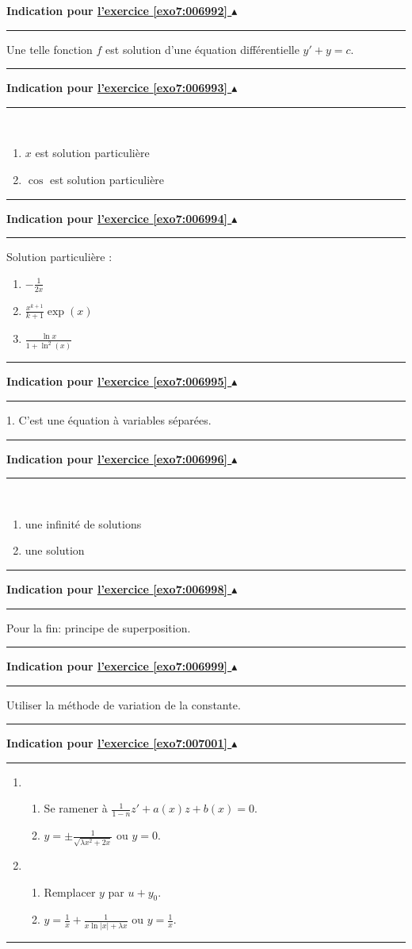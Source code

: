 \documentclass[11pt,a4paper]{article}
\newcommand{\finexercice}{}
\newcommand{\noindication}{}
\newcounter{exo}
\newcommand{\indication}[1]{\hypertarget{ind7:#1}{}\label{ind7:#1}{\bf Indication pour \hyperlink{exo7:#1}{l'exercice \ref{exo7:#1} $\blacktriangle$}}\vspace{1mm}\hrule\vspace{1mm}}
\newcommand{\finindication}{\vspace{1mm}\hrule\vspace*{7mm}}
\newcommand{\finenonces}{\newpage}
\newcommand{\finindications}{\newpage}
\begin{document}
\finexercice

\finfiche


 \finenonces 



 \finindications 

\noindication
\indication{006992}
Une telle fonction $f$ est solution d'une équation différentielle $y'+y=c$.
\finindication
\indication{006993}\ 
\begin{enumerate}
  \item $x$ est solution particulière
  \item $\cos$ est solution particulière
\end{enumerate}
\finindication
\indication{006994}
Solution particulière :
\begin{enumerate}
  \item $-\frac1{2x}$
  
  \item $\frac{x^{k+1}}{k+1} \exp(x)$
  
  \item $\frac{\ln x}{1+\ln^2(x)}$
\end{enumerate}

\finindication
\indication{006995}
1. C'est une équation à variables séparées.
\finindication
\indication{006996}\ 
\begin{enumerate}
  \item une infinité de solutions
  \item une solution
\end{enumerate}
\finindication
\noindication
\indication{006998}
Pour la fin: principe de superposition.
\finindication
\indication{006999}
Utiliser la méthode de variation de la constante.
\finindication
\noindication
\indication{007001}
\begin{enumerate}
  \item
  \begin{enumerate}
    \item Se ramener à $\frac{1}{1-n}z'+a(x)z+b(x)=0$.
    \item $y = \pm\frac{1}{\sqrt{\lambda x^2 + 2x}}$ ou $y=0$.
  \end{enumerate}
    \item 
  \begin{enumerate}
    \item Remplacer $y$ par $u+y_0$.
    \item $y=\frac1x+\frac1{x\ln|x|+\lambda x}$ ou $y = \frac1x$.
  \end{enumerate}
\end{enumerate}    
\finindication
\noindication
\noindication
\end{document}
